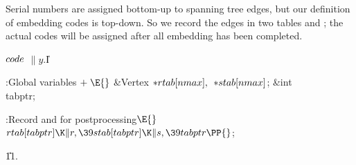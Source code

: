 Serial numbers are assigned bottom-up to spanning tree edges,
but our definition of embedding codes is top-down. So we record the
edges in two tables  and ; the actual codes will be
assigned
after all embedding has been completed.

\Y\B\4\D$\\{code}$ \5
$\|y.{}$\|I\par
\Y\B\4:Global variables\X${}\mathrel+\E{}$\6
\&{Vertex} ${}{*}\\{rtab}[\\{nmax}],{}$ ${}{*}\\{stab}[\\{nmax}]{}$;\6
\&{int} \\{tabptr};\par
\fi

\B{}:Record  and  for postprocessing\X${}\E{}$\6
$\\{rtab}[\\{tabptr}]\K\|r,\39\\{stab}[\\{tabptr}]\K\|s,\39\\{tabptr}\PP{}$;\par
\U11.\fi

